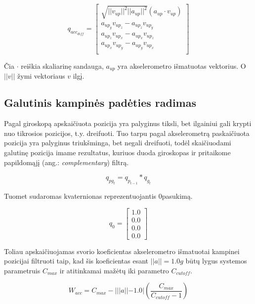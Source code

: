 \documentclass[12pt, a4paper, lithuanian, final]{article}
\begin{document}
\begin{equation}
	q_{acc_{diff}} = \left[
		\begin{array}{c}
			\sqrt{ ||v_{up}||^2 ||a_{up}||^2 } (a_{up} \cdot v_{up}) \\
			a_{up_y}v_{up_z} - a_{up_z}v_{up_y}  \\
			a_{up_z}v_{up_x} - a_{up_x}v_{up_z}  \\
			a_{up_x}v_{up_y} - a_{up_y}v_{up_x}  \\
		\end{array}
	\right]
\end{equation}

Čia $\cdot$ reiškia skaliarinę sandauga, $a_{up}$ yra akselerometro išmatuotas vektorius. O $||v||$ žymi vektoriaus $v$ ilgį.


\subsection{Galutinis kampinės padėties radimas}
\label{subskyr-final-quaternion}

Pagal giroskopą apskaičiuota pozicija yra palyginus tiksli, bet ilgainiui gali krypti nuo tikrosios pozicijos, t.y. dreifuoti.
Tuo tarpu pagal akselerometrą paskaičiuota pozicija yra palyginus triukšminga, bet negali dreifuoti, todėl skaičiuodami galutinę pozicija imame rezultatus, kuriuos duoda giroskopas ir pritaikome papildomąjį (ang.: \textit{complementary}) filtrą.

\begin{equation}
	q_{pg_t} = q_{p_{t-1}} * q_{g_t}
\end{equation}

Tuomet sudaromas kvaternionas reprezentuojantis 0\degree pasukimą.

\begin{equation}
	q_{0} = \left[
		\begin{array}{c}
			1.0 \\
			0.0 \\
			0.0 \\
			0.0
		\end{array}
	\right]
\end{equation}

Toliau apskaičiuojamas svorio koeficientas akselerometro išmatuotai kampinei pozicijai filtruoti taip, kad šis koeficientas esant $||a|| = 1.0g$ būtų lygus systemos parametruis $C_{max}$ ir atitinkamai mažėtų iki parametro $C_{cutoff}$.

\begin{equation}
	W_{acc} = C_{max} - | ||a|| - 1.0 | \left(\dfrac{C_{max}}{C_{cutoff} - 1} \right)
\end{equation}
\end{document}
